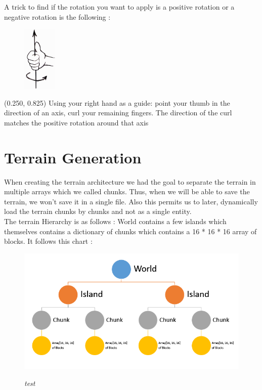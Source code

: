\documentclass[article]{report} %
\begin{document}
			A trick to find if the rotation you want to apply is a positive rotation or a negative rotation is the following : \\
			\begin{figure}[h]
				\includegraphics[]{Images/RotationsPositive.png}
			\end{figure}
			\begin{textblock}{0.628}(0.250, 0.825)
							\noindent  Using your right hand as a guide: point your thumb in the direction of an axis, curl your remaining fingers. The direction of the curl matches the positive rotation around that axis
						\end{textblock}
			\section{Terrain Generation}
				When creating the terrain architecture we had the goal to separate the terrain in multiple arrays which we called chunks. Thus, when we will be able to save the terrain, we won't save it in a single file. Also this permits us to later, dynamically load the terrain chunks by chunks and not as a single entity. \\

				The terrain Hierarchy is as follows : World contains a few islands which themselves contains a dictionary of chunks which contains a 16 * 16 * 16 array of blocks. It follows this chart : 
				\begin{figure}[h]
					\includegraphics[width=18cm]{Images/WorldHierarchy.png}
					\begin{center}\it test \end{center}
				\end{figure}
\end{document}
